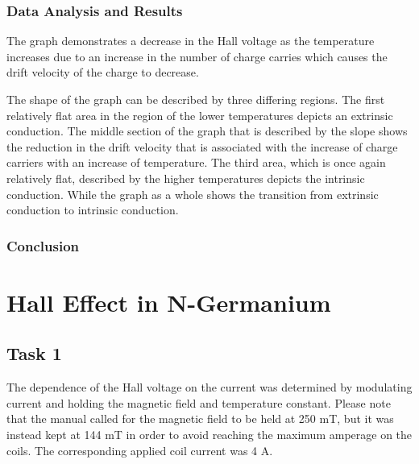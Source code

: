 \documentclass[a4paper]{article}
\begin{document}
\subsubsection{Data Analysis and Results}
\qq The graph demonstrates a decrease in the Hall voltage as the
temperature increases due to an increase in the number of charge
carries which causes the drift velocity of the charge to decrease.

\begin{figure}[H]
\centering
\label{task25plot}
\end{figure}

\qq The shape of the graph can be described by three differing
regions. The first relatively flat area in the region of the lower
temperatures depicts an extrinsic conduction. The middle section of
the graph that is described by the slope shows the reduction in the
drift velocity that is associated with the increase of charge carriers
with an increase of temperature. The third area, which is once again
relatively flat, described by the higher temperatures depicts the
intrinsic conduction. While the graph as a whole shows the transition
from extrinsic conduction to intrinsic conduction.


\subsubsection{Conclusion}

\section{Hall Effect in N-Germanium}

\subsection{Task 1}

\qq The dependence of the Hall voltage on the current was determined 
by modulating current and holding the magnetic field and temperature 
constant. Please note that the manual called for the magnetic field to 
be held at 250 mT, but it was instead kept at 144 mT in order to 
avoid reaching the maximum amperage on the coils. The corresponding
applied coil current was 4 A.
\end{document}

